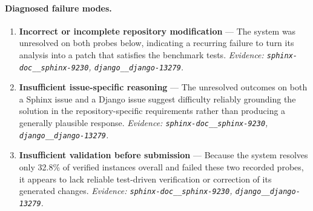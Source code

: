 \paragraph{Diagnosed failure modes.}\begin{enumerate}\itemsep1pt
\item \textbf{Incorrect or incomplete repository modification} --- The system was unresolved on both probes below, indicating a recurring failure to turn its analysis into a patch that satisfies the benchmark tests. \emph{Evidence: \texttt{sphinx-doc\_\_sphinx-9230}, \texttt{django\_\_django-13279}.}
\item \textbf{Insufficient issue-specific reasoning} --- The unresolved outcomes on both a Sphinx issue and a Django issue suggest difficulty reliably grounding the solution in the repository-specific requirements rather than producing a generally plausible response. \emph{Evidence: \texttt{sphinx-doc\_\_sphinx-9230}, \texttt{django\_\_django-13279}.}
\item \textbf{Insufficient validation before submission} --- Because the system resolves only 32.8\% of verified instances overall and failed these two recorded probes, it appears to lack reliable test-driven verification or correction of its generated changes. \emph{Evidence: \texttt{sphinx-doc\_\_sphinx-9230}, \texttt{django\_\_django-13279}.}
\end{enumerate}
